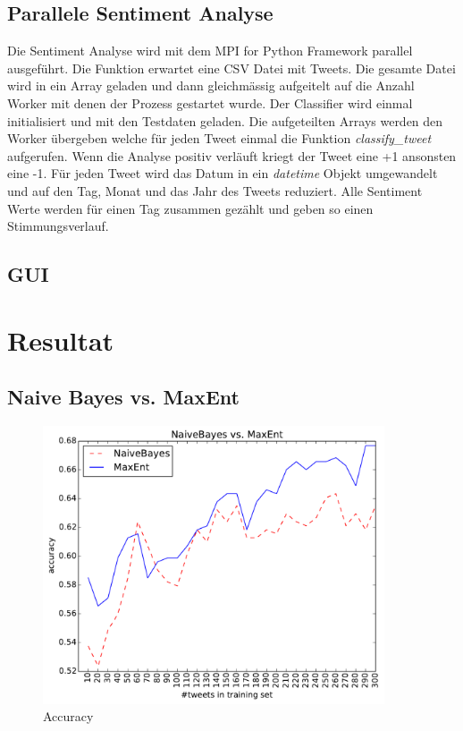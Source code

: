 \documentclass[12pt, oneside]{report}   	%
\begin{document}
\section{Parallele Sentiment Analyse}
Die Sentiment Analyse wird mit dem MPI for Python Framework parallel ausgeführt. Die Funktion erwartet eine CSV Datei mit Tweets. Die gesamte Datei wird in ein Array geladen und dann gleichmässig aufgeitelt auf die Anzahl Worker mit denen der Prozess gestartet wurde. Der Classifier wird einmal initialisiert und mit den Testdaten geladen. Die aufgeteilten Arrays werden den Worker übergeben welche für jeden Tweet einmal die Funktion \emph{classify\_tweet} aufgerufen. Wenn die Analyse positiv verläuft kriegt der Tweet eine +1 ansonsten eine -1. \newline{} 
Für jeden Tweet wird das Datum in ein \emph{datetime} Objekt umgewandelt und auf den Tag, Monat und das Jahr des Tweets reduziert. Alle Sentiment Werte werden für einen Tag zusammen gezählt und geben so einen Stimmungsverlauf.

\section{GUI}


\chapter{Resultat}

\section{Naive Bayes vs. MaxEnt}

\begin{figure}[htbp]
\begin{center}
\includegraphics[width=0.9\textwidth]{bilder/cmp_nb_vs_me_S10_M300-16M.pdf}
\caption{Accuracy}
\label{img:acc}
\end{center}
\end{figure}
\end{document}
